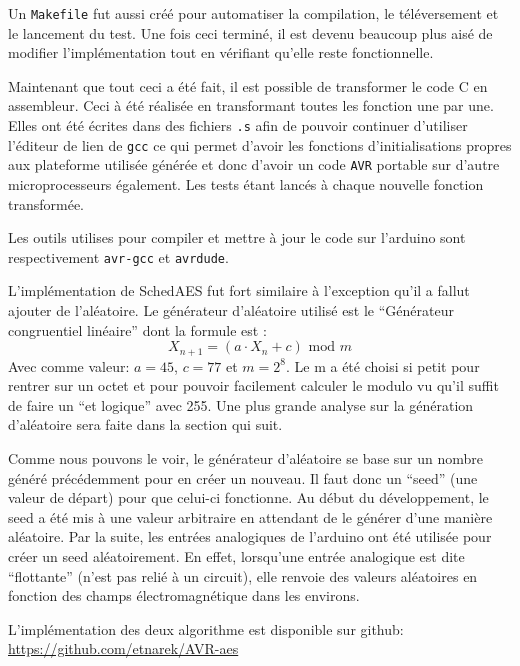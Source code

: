 \documentclass[letterpaper]{article}
\begin{document}
Un \texttt{Makefile} fut aussi créé pour automatiser la compilation, le téléversement et le lancement du test. Une fois ceci terminé, il est devenu beaucoup plus aisé de modifier l'implémentation tout en vérifiant qu'elle reste fonctionnelle. 

Maintenant que tout ceci a été fait, il est possible de transformer le code C en assembleur.
Ceci à été réalisée en transformant toutes les fonction une par une.
Elles ont été écrites dans des fichiers \texttt{.s} afin de pouvoir continuer d'utiliser l'éditeur de lien de \texttt{gcc} ce qui permet d'avoir les fonctions d'initialisations propres aux plateforme utilisée générée et donc d'avoir un code \texttt{AVR} portable sur d'autre microprocesseurs également.
Les tests étant lancés à chaque nouvelle fonction transformée.

Les outils utilises pour compiler et mettre à jour le code sur l'arduino sont respectivement \texttt{avr-gcc} et \texttt{avrdude}.

L'implémentation de SchedAES fut fort similaire à l'exception qu'il a fallut ajouter de l'aléatoire.
Le générateur d'aléatoire utilisé est le ``Générateur congruentiel linéaire'' dont la formule est :
$$ X_{n+1} = (a \cdot X_n  + c) \text{ mod } m$$
Avec comme valeur: $a=45$, $c=77$ et $m=2^8$. Le m a été choisi si petit pour rentrer sur un octet et pour pouvoir facilement calculer le modulo vu qu'il suffit de faire un ``et logique'' avec 255.
Une plus grande analyse sur la génération d'aléatoire sera faite dans la section qui suit.

Comme nous pouvons le voir, le générateur d'aléatoire se base sur un nombre généré précédemment pour en créer un nouveau.
Il faut donc un ``seed'' (une valeur de départ) pour que celui-ci fonctionne.
Au début du développement, le seed a été mis à une valeur arbitraire en attendant de le générer d'une manière aléatoire.
Par la suite, les entrées analogiques de l'arduino ont été utilisée pour créer un seed aléatoirement.
En effet, lorsqu'une entrée analogique est dite ``flottante'' (n'est pas relié à un circuit), elle renvoie des valeurs aléatoires en fonction des champs électromagnétique dans les environs.

L'implémentation des deux algorithme est disponible sur github: \url{https://github.com/etnarek/AVR-aes}
\end{document}
